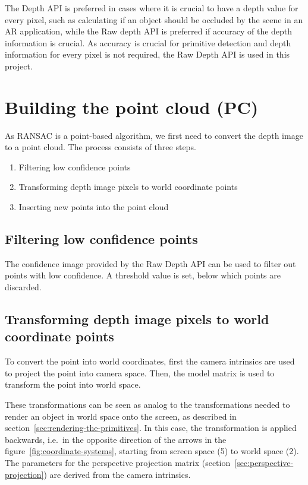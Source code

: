 

The Depth API is preferred in cases where it is crucial to have a depth value for every pixel, such as calculating if an object should be occluded by the scene in an AR application,
while the Raw depth API is preferred if accuracy of the depth information is crucial. \parencite{google_llc_arcore_doc}
As accuracy is crucial for primitive detection and depth information for every pixel is not required, the Raw Depth API is used in this project.


\section{Building the point cloud (PC)}
As RANSAC is a point-based algorithm, we first need to convert the depth image to a point cloud.
The process consists of three steps.
\begin{enumerate}
    \item Filtering low confidence points
    \item Transforming depth image pixels to world coordinate points
    \item Inserting new points into the point cloud
\end{enumerate}

\subsection{Filtering low confidence points}
The confidence image provided by the Raw Depth API can be used to filter out points with low confidence.
A threshold value is set, below which points are discarded.

\subsection{Transforming depth image pixels to world coordinate points}
To convert the point into world coordinates, first the camera intrinsics are used to
project the point into camera space.
Then, the model matrix is used to transform the point into world space.
\parencite{google_llc_codelab_raw_depth,google_llc_arcore_doc}

These transformations can be seen as analog to the transformations needed to
render an object in world space onto the screen, as described in section~\ref{sec:rendering-the-primitives}.
In this case, the transformation is applied backwards, i.e.\ in the opposite direction of the arrows
in the figure~\ref{fig:coordinate-systems}, starting from screen space (5) to world space (2).
The parameters for the perspective projection matrix (section~\ref{sec:perspective-projection}) are derived from the camera intrinsics.


